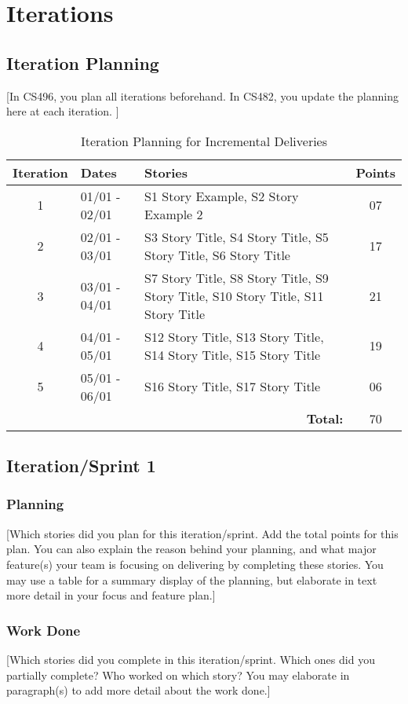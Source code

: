 \documentclass{article}
\begin{document}
\section{Iterations}

\subsection{Iteration Planning}
[In CS496, you plan all iterations beforehand. In CS482, you update the planning here at each iteration. ]

\begin{table}[h!]
\centering
\begin{tabular}{c l p{7cm} c}
\hline
\textbf{Iteration} & \textbf{Dates} & \textbf{Stories} & \textbf{Points} \\
\hline
1 & 01/01 - 02/01 & S1 Story Example, S2 Story Example 2 & 07 \\ \hline
2 & 02/01 - 03/01 & S3 Story Title, S4 Story Title, S5 Story Title, S6 Story Title & 17 \\ \hline
3 & 03/01 - 04/01 & S7 Story Title, S8 Story Title, S9 Story Title, S10 Story Title, S11 Story Title & 21 \\ \hline
4 & 04/01 - 05/01 & S12 Story Title, S13 Story Title, S14 Story Title, S15 Story Title & 19 \\ \hline
5 & 05/01 - 06/01 & S16 Story Title, S17 Story Title & 06 \\ \hline
\multicolumn{3}{r}{\bf Total: } & 70 \\ \hline
\end{tabular}
\caption{Iteration Planning for Incremental Deliveries}
\end{table}

\subsection{Iteration/Sprint 1}
\subsubsection{Planning}
[Which stories did you plan for this iteration/sprint. Add the total points for this plan. You can also explain the reason behind your planning, and what major feature(s) your team is focusing on delivering by completing these stories. You may use a table for a summary display of the planning, but elaborate in text more detail in your focus and feature plan.]

\subsubsection{Work Done}
[Which stories did you complete in this iteration/sprint. Which ones did you partially complete? Who worked on which story? You may elaborate in paragraph(s) to add more detail about the work done.]
\end{document}
